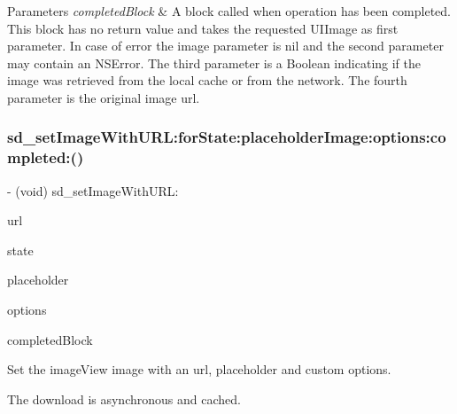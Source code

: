 \begin{DoxyParams}{Parameters}
{\em completed\+Block} & A block called when operation has been completed. This block has no return value and takes the requested U\+I\+Image as first parameter. In case of error the image parameter is nil and the second parameter may contain an N\+S\+Error. The third parameter is a Boolean indicating if the image was retrieved from the local cache or from the network. The fourth parameter is the original image url. \\
\hline
\end{DoxyParams}
\mbox{\label{category_u_i_button_07_web_cache_08_a45e790aa4c92ad7038a4be0d52a75187}} 
\subsubsection{\texorpdfstring{sd\+\_\+set\+Image\+With\+U\+R\+L\+:for\+State\+:placeholder\+Image\+:options\+:completed\+:()}{sd\_setImageWithURL:forState:placeholderImage:options:completed:()}\hspace{0.1cm}{\footnotesize\ttfamily [3/3]}}
{\footnotesize\ttfamily -\/ (void) sd\+\_\+set\+Image\+With\+U\+R\+L\+: \begin{DoxyParamCaption}\item[{(N\+S\+U\+RL $\ast$)}]{url }\item[{forState:(U\+I\+Control\+State)}]{state }\item[{placeholderImage:(U\+I\+Image $\ast$)}]{placeholder }\item[{options:(S\+D\+Web\+Image\+Options)}]{options }\item[{completed:(S\+D\+Web\+Image\+Completion\+Block)}]{completed\+Block }\end{DoxyParamCaption}}

Set the image\+View {\ttfamily image} with an {\ttfamily url}, placeholder and custom options.

The download is asynchronous and cached.


